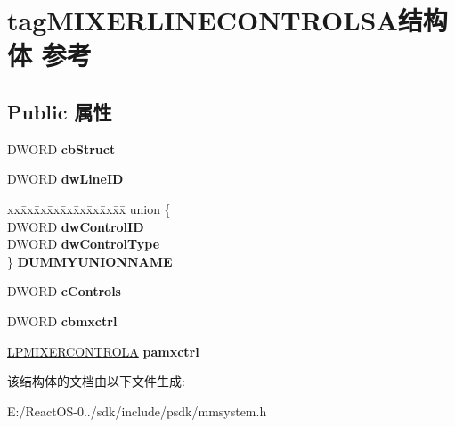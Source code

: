 \hypertarget{structtag_m_i_x_e_r_l_i_n_e_c_o_n_t_r_o_l_s_a}{}\section{tag\+M\+I\+X\+E\+R\+L\+I\+N\+E\+C\+O\+N\+T\+R\+O\+L\+S\+A结构体 参考}
\label{structtag_m_i_x_e_r_l_i_n_e_c_o_n_t_r_o_l_s_a}
\subsection*{Public 属性}
\begin{DoxyCompactItemize}
\item 
\mbox{\label{structtag_m_i_x_e_r_l_i_n_e_c_o_n_t_r_o_l_s_a_aa6df17f075647b3b975e1b2ba952717d}} 
D\+W\+O\+RD {\bfseries cb\+Struct}
\item 
\mbox{\label{structtag_m_i_x_e_r_l_i_n_e_c_o_n_t_r_o_l_s_a_ae324069fd9ca1c7a7a1a02cd5edb041d}} 
D\+W\+O\+RD {\bfseries dw\+Line\+ID}
\item 
\mbox{\label{structtag_m_i_x_e_r_l_i_n_e_c_o_n_t_r_o_l_s_a_abf9d6aa0fe9d8c94d72b9dbbce3fa800}} 
\begin{tabbing}
xx\=xx\=xx\=xx\=xx\=xx\=xx\=xx\=xx\=\kill
union \{\\
\>DWORD {\bfseries dwControlID}\\
\>DWORD {\bfseries dwControlType}\\
\} {\bfseries DUMMYUNIONNAME}\\

\end{tabbing}\item 
\mbox{\label{structtag_m_i_x_e_r_l_i_n_e_c_o_n_t_r_o_l_s_a_afaeefcf16e7b1620018ff2f867017019}} 
D\+W\+O\+RD {\bfseries c\+Controls}
\item 
\mbox{\label{structtag_m_i_x_e_r_l_i_n_e_c_o_n_t_r_o_l_s_a_aa38c3c7f9ecb6da33d770181fe0597c7}} 
D\+W\+O\+RD {\bfseries cbmxctrl}
\item 
\mbox{\label{structtag_m_i_x_e_r_l_i_n_e_c_o_n_t_r_o_l_s_a_a14197d066527ab9705022092697fcbcb}} 
\hyperlink{structtag_m_i_x_e_r_c_o_n_t_r_o_l_a}{L\+P\+M\+I\+X\+E\+R\+C\+O\+N\+T\+R\+O\+LA} {\bfseries pamxctrl}
\end{DoxyCompactItemize}


该结构体的文档由以下文件生成\+:\begin{DoxyCompactItemize}
\item 
E\+:/\+React\+O\+S-\/0../sdk/include/psdk/mmsystem.\+h\end{DoxyCompactItemize}
